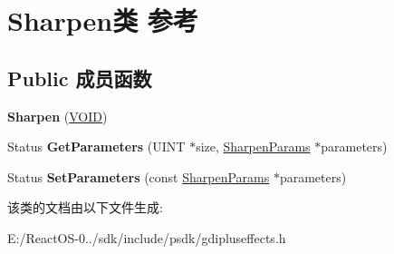 \hypertarget{class_sharpen}{}\section{Sharpen类 参考}
\label{class_sharpen}
\subsection*{Public 成员函数}
\begin{DoxyCompactItemize}
\item 
\mbox{\label{class_sharpen_a823c6a905e89370dfbb0e8b8bb0f96be}} 
{\bfseries Sharpen} (\hyperlink{interfacevoid}{V\+O\+ID})
\item 
\mbox{\label{class_sharpen_a00fe5d6e019909a562b61159fa57f067}} 
Status {\bfseries Get\+Parameters} (U\+I\+NT $\ast$size, \hyperlink{struct_sharpen_params}{Sharpen\+Params} $\ast$parameters)
\item 
\mbox{\label{class_sharpen_a6b4d4596ba3468cc2e151edb5dfcb257}} 
Status {\bfseries Set\+Parameters} (const \hyperlink{struct_sharpen_params}{Sharpen\+Params} $\ast$parameters)
\end{DoxyCompactItemize}


该类的文档由以下文件生成\+:\begin{DoxyCompactItemize}
\item 
E\+:/\+React\+O\+S-\/0../sdk/include/psdk/gdipluseffects.\+h\end{DoxyCompactItemize}
